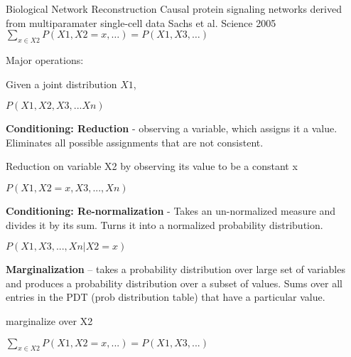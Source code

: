 \documentclass[10pt,twocolumn,letterpaper]{article}
\begin{document}
\begin{comment}
cond = conditionals = {}

remain = 1

for A, B in ut.combinations(events, 2):
    overlap = rand()
    # what probs are already accounted for
    # accounted = sum([cond[A|C] * marg[C] for C in events if A|C in cond])
    cond[A|B] = (1 - accounted) * overlap

# Find the opposite way using bayes rule
for key, val in conditionals.items():
    A, B = key.split()
    cond[B|A] = val * marg[B] / marg[A]
print('cond = %
    
conditional_events = [A, B, C]

a1 = .1
a2 = .2
a3 = .3
a = [float('nan'), .1, .01, .01]
for n in range(1, len(a)):
    P_any_out_c = sum(ut.choose(n, k) * a[k] for k in range(1, n + 1))
    print('n = %
    print('P_any_out_c = %

\end{comment}

Biological Network Reconstruction 
Causal protein signaling networks derived from multiparamater single-cell data
Sachs et al. Science 2005
$\sum_{x \in X2} P(X1, X2=x, \ldots) = P(X1, X3, \ldots)$


Major operations: 

Given a joint distribution 
$X1$,

$P(X1, X2, X3, ... Xn)$

\textbf{Conditioning: Reduction} - observing a variable, which assigns it a value. 
Eliminates all possible assignments that are not consistent. 

Reduction on variable X2 by observing its value to be a constant x

$P(X1, X2=x, X3, ..., Xn)$

\textbf{Conditioning: Re-normalization} - Takes an un-normalized measure and divides it by
its sum. Turns it into a normalized probability distribution.

$P(X1, X3, ..., Xn | X2=x)$


\textbf{Marginalization} -- takes a probability distribution over large set of variables
and produces a probability distribution over a subset of values.  Sums over all 
entries in the PDT (prob distribution table) that have a particular value.

marginalize over X2

$\sum_{x \in X2} P(X1, X2=x, ...) = P(X1, X3, ...)$
\end{document}
